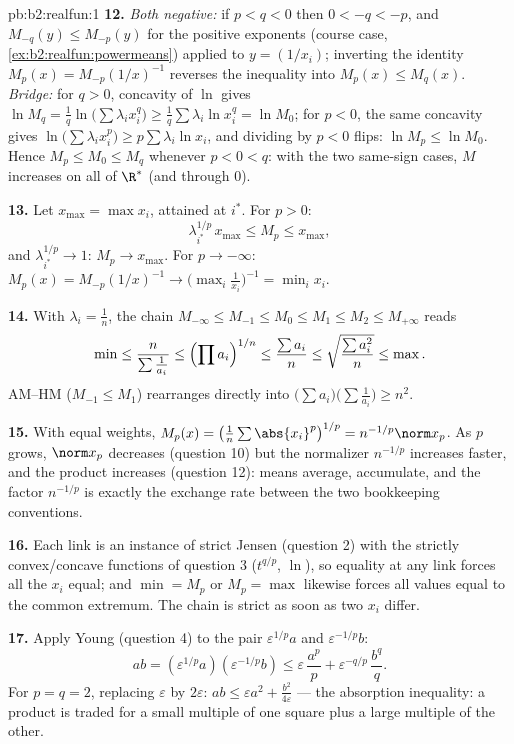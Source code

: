 \begin{solution}{pb:b2:realfun:1}
\textbf{12.} \emph{Both negative:} if $p < q < 0$ then $0 < -q <
-p$, and $M_{-q}(y) \leq M_{-p}(y)$ for the positive exponents
(course case, \cref{ex:b2:realfun:powermeans}) applied to $y =
(1/x_i)$; inverting the identity $M_p(x) = M_{-p}(1/x)^{-1}$
reverses the inequality into $M_p(x) \leq M_q(x)$.
\emph{Bridge:} for $q > 0$, concavity of $\ln$ gives $\ln M_q =
\frac1q\ln\bigl(\sum\lambda_ix_i^q\bigr) \geq
\frac1q\sum\lambda_i\ln x_i^q = \ln M_0$; for $p < 0$, the same
concavity gives $\ln\bigl(\sum\lambda_ix_i^p\bigr) \geq
p\sum\lambda_i\ln x_i$, and dividing by $p < 0$ flips: $\ln M_p
\leq \ln M_0$. Hence $M_p \leq M_0 \leq M_q$ whenever $p < 0 <
q$: with the two same-sign cases, $M$ increases on all of
$\R^*$ (and through $0$).

\textbf{13.} Let $x_{\max} = \max x_i$, attained at $i^*$. For
$p > 0$:
\[
\lambda_{i^*}^{1/p}\,x_{\max} \leq M_p \leq x_{\max},
\]
and $\lambda_{i^*}^{1/p} \to 1$: $M_p \to x_{\max}$. For $p \to
-\infty$: $M_p(x) = M_{-p}(1/x)^{-1} \to
\bigl(\max_i\frac1{x_i}\bigr)^{-1} = \min_ix_i$.

\textbf{14.} With $\lambda_i = \frac1n$, the chain $M_{-\infty}
\leq M_{-1} \leq M_0 \leq M_1 \leq M_2 \leq M_{+\infty}$ reads
\[
\min \leq \frac{n}{\sum\frac1{a_i}} \leq \Bigl(\prod
a_i\Bigr)^{1/n} \leq \frac{\sum a_i}{n} \leq
\sqrt{\frac{\sum a_i^2}{n}} \leq \max .
\]
AM--HM ($M_{-1} \leq M_1$) rearranges directly into
$\bigl(\sum a_i\bigr)\bigl(\sum\frac1{a_i}\bigr) \geq n^2$.

\textbf{15.} With equal weights, $M_p(x) =
\bigl(\frac1n\sum\abs{x_i}^p\bigr)^{1/p} = n^{-1/p}\norm x_p$.
As $p$ grows, $\norm x_p$ decreases (question 10) but the
normalizer $n^{-1/p}$ increases faster, and the product
increases (question 12): means average,  accumulate, and
the factor $n^{-1/p}$ is exactly the exchange rate between the
two bookkeeping conventions.

\textbf{16.} Each link is an instance of strict Jensen
(question 2) with the strictly convex/concave functions of
question 3 ($t^{q/p}$, $\ln$), so equality at any link forces
all the $x_i$ equal; and $\min = M_p$ or $M_p = \max$ likewise
forces all values equal to the common extremum. The chain is
strict as soon as two $x_i$ differ.

\textbf{17.} Apply Young (question 4) to the pair
$\varepsilon^{1/p}a$ and $\varepsilon^{-1/p}b$:
\[
ab = (\varepsilon^{1/p}a)(\varepsilon^{-1/p}b)
\leq \varepsilon\,\frac{a^p}p +
\varepsilon^{-q/p}\,\frac{b^q}q .
\]
For $p = q = 2$, replacing $\varepsilon$ by $2\varepsilon$:
$ab \leq \varepsilon a^2 + \frac{b^2}{4\varepsilon}$ --- the
absorption inequality: a product is traded for a small multiple
of one square plus a large multiple of the other.


\end{solution}
